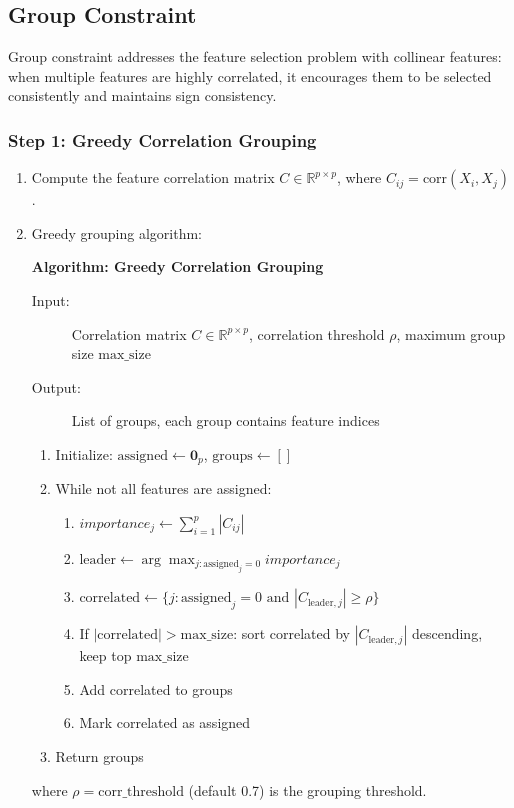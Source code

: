 \documentclass{article}
\begin{document}
\subsection{Group Constraint}

Group constraint addresses the feature selection problem with collinear features: when multiple features are highly correlated, it encourages them to be selected consistently and maintains sign consistency.

\subsubsection{Step 1: Greedy Correlation Grouping}

\begin{enumerate}
\item Compute the feature correlation matrix $C \in \mathbb{R}^{p \times p}$, where $C_{ij} = \mathrm{corr}(X_i, X_j)$.

\item Greedy grouping algorithm:

\vspace{0.5em}
\noindent\textbf{Algorithm: Greedy Correlation Grouping}
\begin{description}
\item[Input:] Correlation matrix $C \in \mathbb{R}^{p \times p}$, correlation threshold $\rho$, maximum group size $\text{max\_size}$
\item[Output:] List of groups, each group contains feature indices
\end{description}

\begin{enumerate}
\item[1.] Initialize: $\text{assigned} \leftarrow \mathbf{0}_p$, $\text{groups} \leftarrow []$
\item[2.] While not all features are assigned:
    \begin{enumerate}
    \item[$a.$] $importance_j \leftarrow \sum_{i=1}^p |C_{ij}|$
    \item[$b.$] $\text{leader} \leftarrow \arg\max_{j: \text{assigned}_j = 0} importance_j$
    \item[$c.$] $\text{correlated} \leftarrow \{j: \text{assigned}_j = 0 \text{ and } |C_{\text{leader}, j}| \geq \rho\}$
    \item[$d.$] If $|\text{correlated}| > \text{max\_size}$: sort correlated by $|C_{\text{leader}, j}|$ descending, keep top $\text{max\_size}$
    \item[$e.$] Add correlated to groups
    \item[$f.$] Mark correlated as assigned
    \end{enumerate}
\item[3.] Return groups
\end{enumerate}

\vspace{0.5em}
where $\rho = \text{corr\_threshold}$ (default 0.7) is the grouping threshold.
\end{enumerate}
\end{document}
